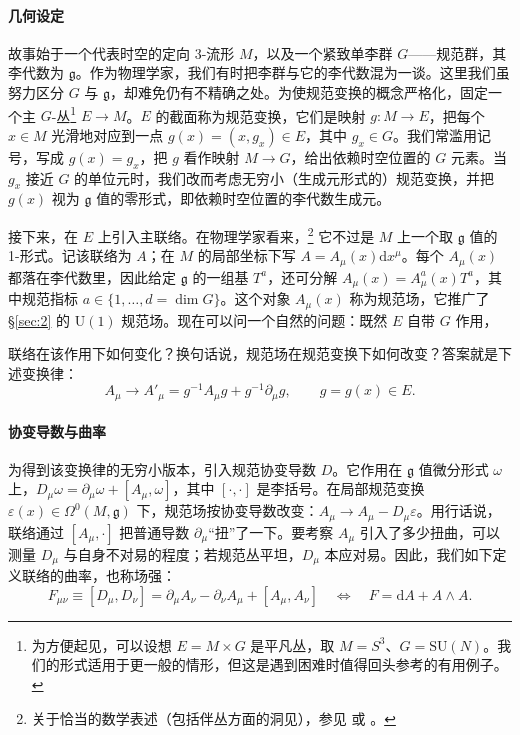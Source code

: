 \documentclass[11pt,a4paper]{article}
\newcommand{\dd}{\mathrm{d}}
\begin{document}
\paragraph{几何设定}
故事始于一个代表时空的定向 3-流形 $M$，以及一个紧致单李群 $G$——规范群，其李代数为 $\mathfrak{g}$。作为物理学家，我们有时把李群与它的李代数混为一谈。这里我们虽努力区分 $G$ 与 $\mathfrak{g}$，却难免仍有不精确之处。为使规范变换的概念严格化，固定一个主 $G$-丛\footnote{为方便起见，可以设想 $E=M\times G$ 是平凡丛，取 $M=S^3$、$G=\mathrm{SU}(N)$。我们的形式适用于更一般的情形，但这是遇到困难时值得回头参考的有用例子。} $E\to M$。$E$ 的截面称为规范变换，它们是映射 $g\colon M\to E$，把每个 $x\in M$ 光滑地对应到一点 $g(x)=(x,g_x)\in E$，其中 $g_x\in G$。我们常滥用记号，写成 $g(x)=g_x$，把 $g$ 看作映射 $M\to G$，给出依赖时空位置的 $G$ 元素。当 $g_x$ 接近 $G$ 的单位元时，我们改而考虑无穷小（生成元形式的）规范变换，并把 $g(x)$ 视为 $\mathfrak{g}$ 值的零形式，即依赖时空位置的李代数生成元。

接下来，在 $E$ 上引入主联络。在物理学家看来，\footnote{关于恰当的数学表述（包括伴丛方面的洞见），参见 \cite{steenrod1951} 或 \cite{nakahara}。} 它不过是 $M$ 上一个取 $\mathfrak{g}$ 值的 1-形式。记该联络为 $A$；在 $M$ 的局部坐标下写 $A=A_\mu(x)\dd x^\mu$。每个 $A_\mu(x)$ 都落在李代数里，因此给定 $\mathfrak{g}$ 的一组基 $T^a$，还可分解 $A_\mu(x)=A^a_\mu(x)T^a$，其中规范指标 $a\in\{1,\dots,d=\dim G\}$。这个对象 $A_\mu(x)$ 称为规范场，它推广了 \S\ref{sec:2} 的 $\mathrm{U}(1)$ 规范场。现在可以问一个自然的问题：既然 $E$ 自带 $G$ 作用，

联络在该作用下如何变化？换句话说，规范场在规范变换下如何改变？答案就是下述变换律：
\begin{equation}\tag{3.1}\label{eq:3.1}
  A_\mu \longrightarrow A'_\mu = g^{-1}A_\mu g + g^{-1}\partial_\mu g,
  \qquad g = g(x)\in E.
\end{equation}

\paragraph{协变导数与曲率}
为得到该变换律的无穷小版本，引入规范协变导数 $D$。它作用在 $\mathfrak{g}$ 值微分形式 $\omega$ 上，$D_\mu\omega=\partial_\mu\omega+[A_\mu,\omega]$，其中 $[\cdot,\cdot]$ 是李括号。在局部规范变换 $\varepsilon(x)\in\Omega^0(M,\mathfrak{g})$ 下，规范场按协变导数改变：$A_\mu\to A_\mu-D_\mu\varepsilon$。用行话说，联络通过 $[A_\mu,\cdot]$ 把普通导数 $\partial_\mu$“扭”了一下。要考察 $A_\mu$ 引入了多少扭曲，可以测量 $D_\mu$ 与自身不对易的程度；若规范丛平坦，$D_\mu$ 本应对易。因此，我们如下定义联络的曲率，也称场强：
\begin{equation}\tag{3.2}\label{eq:3.2}
  F_{\mu\nu} \equiv [D_\mu, D_\nu] = \partial_\mu A_\nu - \partial_\nu A_\mu + [A_\mu, A_\nu]
  \quad\Longleftrightarrow\quad F = \dd A + A\wedge A.
\end{equation}
\end{document}
